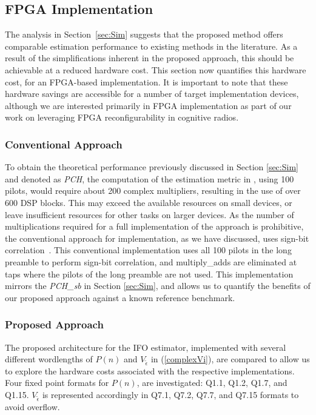 \subsection{FPGA Implementation}
\label{sec:Imple}
The analysis in Section~\ref{sec:Sim} suggests that the proposed method offers comparable estimation performance to existing methods in the literature.
As a result of the simplifications inherent in the proposed approach, this should be achievable at a reduced hardware cost.
This section now quantifies this hardware cost, for an FPGA-based implementation.
It is important to note that these hardware savings are accessible for a number of target implementation devices, although we are interested primarily in FPGA implementation as part of our work on leveraging FPGA reconfigurability in cognitive radios.

\subsubsection{Conventional Approach}
To obtain the theoretical performance previously discussed in Section \ref{sec:Sim} and denoted as \emph{PCH}, the computation of the estimation metric in \cite{Park2002}, using 100 pilots, would require about 200 complex multipliers, resulting in the use of over 600 DSP blocks. This may exceed the available resources on small devices, or leave insufficient resources for other tasks on larger devices.
As the number of multiplications required for a full implementation of the approach is prohibitive, the conventional approach for implementation, as we have discussed, uses sign-bit correlation~\cite{Kim2008}.
This conventional implementation uses all 100 pilots in the long preamble to perform sign-bit correlation, and multiply\_adds are eliminated at taps where the pilots of the long preamble are not used.
This implementation mirrors the \emph{PCH\_sb} in Section \ref{sec:Sim}, and allows us to quantify the benefits of our proposed approach against a known reference benchmark.

\subsubsection{Proposed Approach}

The proposed architecture for the IFO estimator, implemented with several different wordlengths of $P(n)$ and $V_{\tilde{\epsilon}}$ in (\ref{complexVi}), are compared to allow us to explore the hardware costs associated with the respective implementations.
Four fixed point formats for $P(n)$, are investigated: Q1.1, Q1.2, Q1.7, and Q1.15.
$V_{\tilde{\epsilon}}$  is represented accordingly in Q7.1, Q7.2, Q7.7, and Q7.15 formats to avoid overflow.

